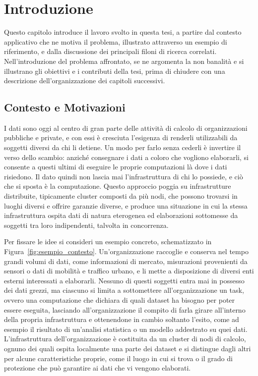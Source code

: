 \chapter{Introduzione}
\label{cap:introduzione}

Questo capitolo introduce il lavoro svolto in questa tesi, a partire dal contesto applicativo che ne motiva il problema, illustrato attraverso un esempio di riferimento, e dalla discussione dei principali filoni di ricerca correlati. Nell'introduzione del problema affrontato, se ne argomenta la non banalità e si illustrano gli obiettivi e i contributi della tesi, prima di chiudere con una descrizione dell'organizzazione dei capitoli successivi.


\section{Contesto e Motivazioni}
\label{sec:contesto}

I dati sono oggi al centro di gran parte delle attività di calcolo di organizzazioni pubbliche e private, e con essi è cresciuta l'esigenza di renderli utilizzabili da soggetti diversi da chi li detiene. Un modo per farlo senza cederli è invertire il verso dello scambio: anziché consegnare i dati a coloro che vogliono elaborarli, si consente a questi ultimi di eseguire le proprie computazioni là dove i dati risiedono. Il dato quindi non lascia mai l'infrastruttura di chi lo possiede, e ciò che si sposta è la computazione. Questo approccio poggia su infrastrutture distribuite, tipicamente cluster composti da più nodi, che possono trovarsi in luoghi diversi e offrire garanzie diverse, e produce una situazione in cui la stessa infrastruttura ospita dati di natura eterogenea ed elaborazioni sottomesse da soggetti tra loro indipendenti, talvolta in concorrenza.

Per fissare le idee si consideri un esempio concreto, schematizzato in Figura~\ref{fig:esempio_contesto}. Un'organizzazione raccoglie e conserva nel tempo grandi volumi di dati, come informazioni di mercato, misurazioni provenienti da sensori o dati di mobilità e traffico urbano, e li mette a disposizione di diversi enti esterni interessati a elaborarli. Nessuno di questi soggetti entra mai in possesso dei dati grezzi, ma ciascuno si limita a sottomettere all'organizzazione un task, ovvero una computazione che dichiara di quali dataset ha bisogno per poter essere eseguita, lasciando all'organizzazione il compito di farla girare all'interno della propria infrastruttura e ottenendone in cambio soltanto l'esito, come ad esempio il risultato di un'analisi statistica o un modello addestrato su quei dati. L'infrastruttura dell'organizzazione è costituita da un cluster di nodi di calcolo, ognuno dei quali ospita localmente una parte dei dataset e si distingue dagli altri per alcune caratteristiche proprie, come il luogo in cui si trova o il grado di protezione che può garantire ai dati che vi vengono elaborati.

